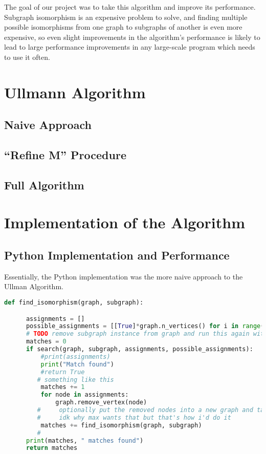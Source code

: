 \documentclass{article}
\begin{document}
The goal of our project was to take this algorithm and improve its performance. Subgraph isomorphism is an expensive problem to solve, and finding multiple possible isomorphisms from one graph to subgraphs of another is even more expensive, so even slight improvements in the algorithm's performance is likely to lead to large performance improvements in any large-scale program which needs to use it often.

\section{Ullmann Algorithm}

  \subsection{Naive Approach}

  \subsection{``Refine M'' Procedure}

  \subsection{Full Algorithm}

\section{Implementation of the Algorithm}

  \subsection{Python Implementation and Performance}
  Essentially, the Python implementation was the more naive approach to the Ullman Algorithm.



  \begin{lstlisting}[language=Python]
  def find_isomorphism(graph, subgraph):

      assignments = []
      possible_assignments = [[True]*graph.n_vertices() for i in range(subgraph.n_vertices())]
      # TODO remove subgraph instance from graph and run this again with the modified graph
      matches = 0
      if search(graph, subgraph, assignments, possible_assignments):
          #print(assignments)
          print("Match found")
          #return True
         # something like this
          matches += 1
          for node in assignments:
              graph.remove_vertex(node)
         #     optionally put the removed nodes into a new graph and tack that onto a list
         #     idk why max wants that but that's how i'd do it
          matches += find_isomorphism(graph, subgraph)
         #
      print(matches, " matches found")
      return matches
  \end{lstlisting}
\end{document}
